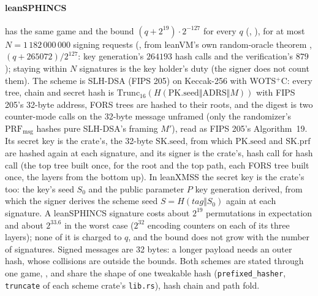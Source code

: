 \documentclass[11pt]{article}
\begin{document}
\paragraph{leanSPHINCS} has the same game and the bound $(q + 2^{19})\cdot 2^{-127}$ for every $q$
(, ), for at most
$N = 1\,182\,000\,000$ signing requests (, from
leanVM's own random-oracle theorem , $(q + 265072)/2^{127}$: key
generation's $264193$ hash calls and the verification's $879$); staying within $N$ signatures is the key holder's duty (the signer does not
count them). The scheme is SLH-DSA (FIPS 205) on Keccak-256 with WOTS$^+$C: every tree, chain and
secret hash is $\mathrm{Trunc}_{16}(H(\mathrm{PK.seed} \Vert \mathrm{ADRS} \Vert M))$ with FIPS 205's
32-byte address, FORS trees are hashed to their roots, and the digest is two counter-mode calls on
the 32-byte message unframed (only the randomizer's $\mathrm{PRF}_{\mathrm{msg}}$ hashes pure
SLH-DSA's framing $M'$), read as FIPS 205's Algorithm~19. Its secret key is the crate's, the
32-byte $\mathrm{SK.seed}$, from which $\mathrm{PK.seed}$ and $\mathrm{SK.prf}$ are hashed again at
each signature, and its signer is the
crate's, hash call for hash call (the top tree built once, for the root and the top path, each FORS
tree built once, the layers from the bottom up). In leanXMSS the secret key is the crate's too: the
key's seed $S_0$ and the public parameter $P$ key generation derived, from which the signer derives
the scheme seed $S = H(\mathit{tag} \Vert S_0)$ again at each signature. A leanSPHINCS signature
costs about $2^{19}$ permutations in expectation and about $2^{33.6}$ in the worst case ($2^{32}$
encoding counters on each of its three layers); none of it is charged to $q$, and the bound does not
grow with the number of signatures. Signed messages are 32 bytes: a longer payload needs an outer
hash, whose collisions are outside the bounds. Both schemes are stated through one game,
,
and share the shape of one tweakable hash (\texttt{prefixed\_hasher}, \texttt{truncate} of each
scheme crate's \texttt{lib.rs}), hash chain and path fold.
\end{document}

